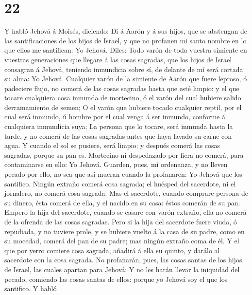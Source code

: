 \hypertarget{section-21}{%
\section{22}\label{section-21}}

 Y habló Jehová á Moisés, diciendo:  Di á Aarón
y á sus hijos, que se abstengan de las santificaciones de los hijos de
Israel, y que no profanen mi santo nombre en lo que ellos me santifican:
Yo Jehová.  Diles: Todo varón de toda vuestra simiente en
vuestras generaciones que llegare á las cosas sagradas, que los hijos de
Israel consagran á Jehová, teniendo inmundicia sobre sí, de delante de
mí será cortada su alma: Yo Jehová.  Cualquier varón de la
simiente de Aarón que fuere leproso, ó padeciere flujo, no comerá de las
cosas sagradas hasta que esté limpio: y el que tocare cualquiera cosa
inmunda de mortecino, ó el varón del cual hubiere salido derramamiento
de semen;  O el varón que hubiere tocado cualquier reptil,
por el cual será inmundo, ú hombre por el cual venga á ser inmundo,
conforme á cualquiera inmundicia suya;  La persona que lo
tocare, será inmunda hasta la tarde, y no comerá de las cosas sagradas
antes que haya lavado su carne con agua.  Y cuando el sol se
pusiere, será limpio; y después comerá las cosas sagradas, porque su pan
es.  Mortecino ni despedazado por fiera no comerá, para
contaminarse en ello: Yo Jehová.  Guarden, pues, mi
ordenanza, y no lleven pecado por ello, no sea que así mueran cuando la
profanaren: Yo Jehová que los santifico.  Ningún extraño
comerá cosa sagrada; el huésped del sacerdote, ni el jornalero, no
comerá cosa sagrada.  Mas el sacerdote, cuando comprare
persona de su dinero, ésta comerá de ella, y el nacido en su casa: éstos
comerán de su pan.  Empero la hija del sacerdote, cuando se
casare con varón extraño, ella no comerá de la ofrenda de las cosas
sagradas.  Pero si la hija del sacerdote fuere viuda, ó
repudiada, y no tuviere prole, y se hubiere vuelto á la casa de su
padre, como en su mocedad, comerá del pan de su padre; mas ningún
extraño coma de él.  Y el que por yerro comiere cosa
sagrada, añadirá á ella su quinto, y darálo al sacerdote con la cosa
sagrada.  No profanarán, pues, las cosas santas de los
hijos de Israel, las cuales apartan para Jehová:  Y no les
harán llevar la iniquidad del pecado, comiendo las cosas santas de
ellos: porque yo Jehová soy el que los santifico.  Y habló
